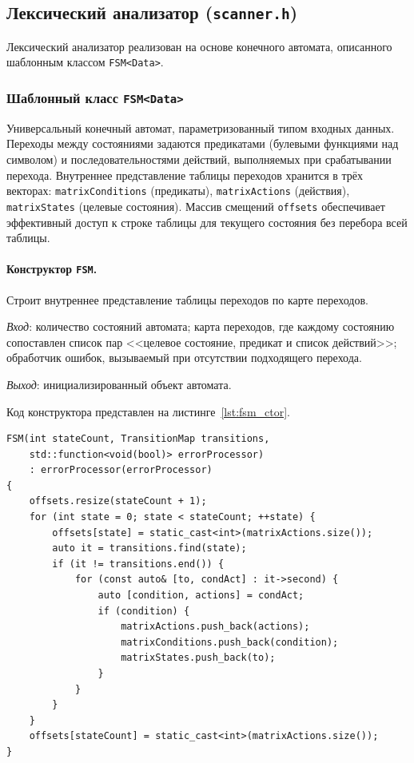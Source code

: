 \documentclass[a4paper,final]{article}
\begin{document}
\subsection{Лексический анализатор (\texttt{scanner.h})}

Лексический анализатор реализован на основе конечного автомата, описанного
шаблонным классом \texttt{FSM<Data>}.

\subsubsection*{Шаблонный класс \texttt{FSM<Data>}}

Универсальный конечный автомат, параметризованный типом входных данных.
Переходы между состояниями задаются предикатами (булевыми функциями над
символом) и последовательностями действий, выполняемых при срабатывании
перехода. Внутреннее представление таблицы переходов хранится в трёх векторах: \texttt{matrixConditions} (предикаты),
\texttt{matrixActions} (действия), \texttt{matrixStates} (целевые состояния).
Массив смещений \texttt{offsets} обеспечивает эффективный доступ к строке
таблицы для текущего состояния без перебора всей таблицы.

\paragraph{Конструктор \texttt{FSM}.} \mbox{}

Строит внутреннее представление таблицы переходов по карте переходов.

\textit{Вход}: количество состояний автомата; карта переходов, где каждому
состоянию сопоставлен список пар <<целевое состояние, предикат и список
действий>>; обработчик ошибок, вызываемый при отсутствии подходящего перехода.

\textit{Выход}: инициализированный объект автомата.

Код конструктора представлен на листинге~\ref{lst:fsm_ctor}.

\begin{lstlisting}[caption={Конструктор FSM}, label=lst:fsm_ctor]
FSM(int stateCount, TransitionMap transitions,
    std::function<void(bool)> errorProcessor)
    : errorProcessor(errorProcessor)
{
    offsets.resize(stateCount + 1);
    for (int state = 0; state < stateCount; ++state) {
        offsets[state] = static_cast<int>(matrixActions.size());
        auto it = transitions.find(state);
        if (it != transitions.end()) {
            for (const auto& [to, condAct] : it->second) {
                auto [condition, actions] = condAct;
                if (condition) {
                    matrixActions.push_back(actions);
                    matrixConditions.push_back(condition);
                    matrixStates.push_back(to);
                }
            }
        }
    }
    offsets[stateCount] = static_cast<int>(matrixActions.size());
}
\end{lstlisting}
\end{document}
